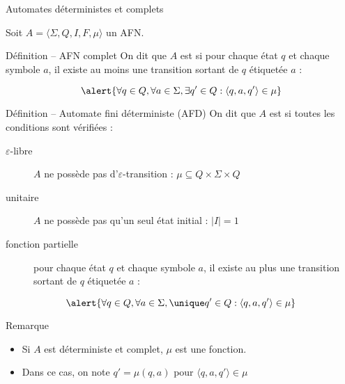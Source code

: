 
\begingroup

\begin{frame}{Automates déterministes et complets}

  \vspace{-1mm}

  Soit $A = \langle \Sigma, Q, I, F, \mu \rangle$ un AFN.

  \vspace{-1mm}
  \begin{block}{Définition -- AFN complet}
    On dit que $A$ est  si pour chaque état $q$ et chaque symbole $a$, il existe au moins une transition sortant de $q$ étiquetée $a$ :

    \vspace{-3mm}
    $$\alert{\forall q\in Q,  \forall a\in \Sigma, \exists q' \in Q : \langle q,a, q' \rangle \in \mu}$$
  \end{block}
  
  \vspace{-3mm}
  \begin{block}{Définition -- Automate fini déterministe (AFD)}
    On dit que $A$ est  si toutes les conditions sont vérifiées : 
    \begin{description}
    \item[$\varepsilon$-libre] $A$ ne possède pas d'$\varepsilon$-transition : \alert{$\mu \subseteq Q \times \Sigma \times Q$}
    \item[unitaire] $A$ ne possède pas qu'un seul état initial : \alert{$|I| = 1$}
    \item[fonction partielle]  pour chaque état $q$ et chaque symbole $a$, il existe au plus une transition sortant de $q$ étiquetée $a$ : 
    \end{description}
    $$\alert{\forall q\in Q,  \forall a\in \Sigma, \unique q' \in Q : \langle q, a, q' \rangle \in \mu}$$
  \end{block}


  \vspace{-2mm}
  \begin{alertblock}{Remarque}
    \begin{itemize}
    \item \vspace{-3mm} Si $A$ est déterministe et complet, $\mu$ est une fonction.
    \item \vspace{-1mm} Dans ce cas, on note $q' = \mu(q, a)$ pour $\langle q, a, q' \rangle \in \mu$
    \end{itemize}
  \end{alertblock}
\end{frame}

\endgroup
